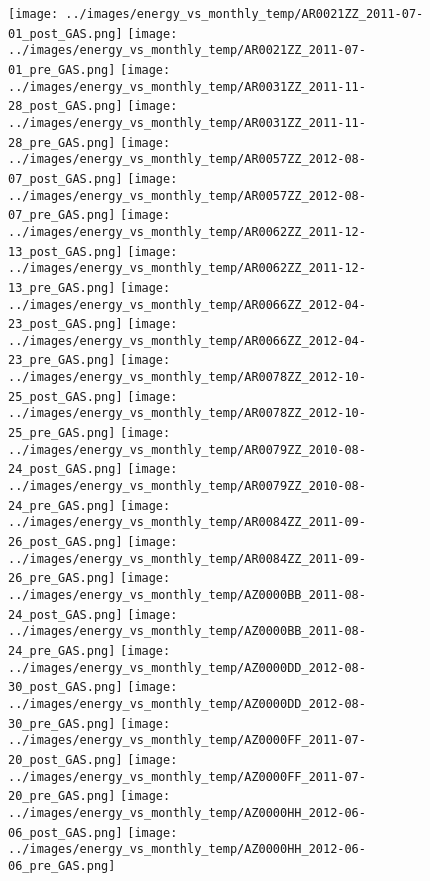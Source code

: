 \clearpage
\begin{figure}
\centering
\texttt{[image: ../images/energy\_vs\_monthly\_temp/AR0021ZZ\_2011-07-01\_post\_GAS.png]}
\texttt{[image: ../images/energy\_vs\_monthly\_temp/AR0021ZZ\_2011-07-01\_pre\_GAS.png]}
\texttt{[image: ../images/energy\_vs\_monthly\_temp/AR0031ZZ\_2011-11-28\_post\_GAS.png]}
\texttt{[image: ../images/energy\_vs\_monthly\_temp/AR0031ZZ\_2011-11-28\_pre\_GAS.png]}
\texttt{[image: ../images/energy\_vs\_monthly\_temp/AR0057ZZ\_2012-08-07\_post\_GAS.png]}
\texttt{[image: ../images/energy\_vs\_monthly\_temp/AR0057ZZ\_2012-08-07\_pre\_GAS.png]}
\texttt{[image: ../images/energy\_vs\_monthly\_temp/AR0062ZZ\_2011-12-13\_post\_GAS.png]}
\texttt{[image: ../images/energy\_vs\_monthly\_temp/AR0062ZZ\_2011-12-13\_pre\_GAS.png]}
\texttt{[image: ../images/energy\_vs\_monthly\_temp/AR0066ZZ\_2012-04-23\_post\_GAS.png]}
\texttt{[image: ../images/energy\_vs\_monthly\_temp/AR0066ZZ\_2012-04-23\_pre\_GAS.png]}
\texttt{[image: ../images/energy\_vs\_monthly\_temp/AR0078ZZ\_2012-10-25\_post\_GAS.png]}
\texttt{[image: ../images/energy\_vs\_monthly\_temp/AR0078ZZ\_2012-10-25\_pre\_GAS.png]}
\texttt{[image: ../images/energy\_vs\_monthly\_temp/AR0079ZZ\_2010-08-24\_post\_GAS.png]}
\texttt{[image: ../images/energy\_vs\_monthly\_temp/AR0079ZZ\_2010-08-24\_pre\_GAS.png]}
\texttt{[image: ../images/energy\_vs\_monthly\_temp/AR0084ZZ\_2011-09-26\_post\_GAS.png]}
\texttt{[image: ../images/energy\_vs\_monthly\_temp/AR0084ZZ\_2011-09-26\_pre\_GAS.png]}
\texttt{[image: ../images/energy\_vs\_monthly\_temp/AZ0000BB\_2011-08-24\_post\_GAS.png]}
\texttt{[image: ../images/energy\_vs\_monthly\_temp/AZ0000BB\_2011-08-24\_pre\_GAS.png]}
\texttt{[image: ../images/energy\_vs\_monthly\_temp/AZ0000DD\_2012-08-30\_post\_GAS.png]}
\texttt{[image: ../images/energy\_vs\_monthly\_temp/AZ0000DD\_2012-08-30\_pre\_GAS.png]}
\texttt{[image: ../images/energy\_vs\_monthly\_temp/AZ0000FF\_2011-07-20\_post\_GAS.png]}
\texttt{[image: ../images/energy\_vs\_monthly\_temp/AZ0000FF\_2011-07-20\_pre\_GAS.png]}
\texttt{[image: ../images/energy\_vs\_monthly\_temp/AZ0000HH\_2012-06-06\_post\_GAS.png]}
\texttt{[image: ../images/energy\_vs\_monthly\_temp/AZ0000HH\_2012-06-06\_pre\_GAS.png]}
\end{figure}
